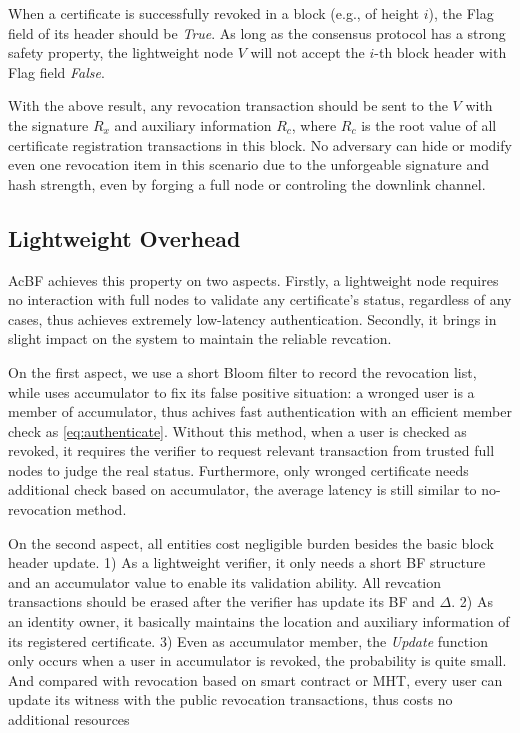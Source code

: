 \documentclass[conference]{IEEEtran}
\begin{document}
\begin{IEEEproof}
When a certificate is successfully revoked in a block (e.g., of height $i$), the Flag field of its header should be \textit{True}. As long as the consensus protocol has a strong safety property, the lightweight node $V$ will not accept the $i$-th block header with Flag field \textit{False}. 

With the above result, any revocation transaction should be sent to the $V$ with the signature $R_x$ and auxiliary information $R_c$, where $R_c$ is the root value of all certificate registration transactions in this block. No adversary can hide or modify even one revocation item in this scenario due to the unforgeable signature and hash strength, even by forging a full node or controling the downlink channel.
\end{IEEEproof}

\subsection{Lightweight Overhead}
AcBF achieves this property on two aspects. Firstly, a lightweight node requires no interaction with full nodes to validate any certificate's status, regardless of any cases, thus achieves extremely low-latency authentication. Secondly, it brings in slight impact on the system to maintain the reliable revcation.

On the first aspect, we use a short Bloom filter to record the revocation list, while uses accumulator to fix its false positive situation: a wronged user is a member of accumulator, thus achives fast authentication with an efficient member check as \eqref{eq:authenticate}. Without this method, when a user is checked as revoked, it requires the verifier to request relevant transaction from trusted full nodes to judge the real status. Furthermore, only wronged certificate needs additional check based on accumulator, the average latency is still similar to no-revocation method. 

On the second aspect, all entities cost negligible burden besides the basic block header update. 1) As a lightweight verifier, it only needs a short BF structure and an accumulator value to enable its validation ability. All revcation transactions should be erased after the verifier has update its BF and $\Delta$. 2) As an identity owner, it basically maintains the location and auxiliary information of its registered certificate. 3) Even as accumulator member, the \textit{Update} function only occurs when a user in accumulator is revoked, the probability is quite small. And compared with revocation based on smart contract or MHT, every user can update its witness with the public revocation transactions, thus costs no additional resources
\end{document}
